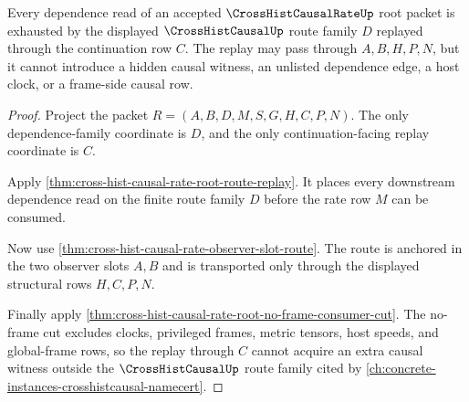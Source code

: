 \begin{theorem}
\label{thm:cross-hist-causal-rate-root-dependence-route-exhaustion}
Every dependence read of an accepted $\CrossHistCausalRateUp$ root packet is exhausted by the displayed $\CrossHistCausalUp$ route family $D$ replayed through the continuation row $C$. The replay may pass through $A,B,H,P,N$, but it cannot introduce a hidden causal witness, an unlisted dependence edge, a host clock, or a frame-side causal row.
\end{theorem}
\begin{proof}
Project the packet $R=(A,B,D,M,S,G,H,C,P,N)$. The only dependence-family coordinate is $D$, and the only continuation-facing replay coordinate is $C$.

Apply \autoref{thm:cross-hist-causal-rate-root-route-replay}. It places every downstream dependence read on the finite route family $D$ before the rate row $M$ can be consumed.

Now use \autoref{thm:cross-hist-causal-rate-observer-slot-route}. The route is anchored in the two observer slots $A,B$ and is transported only through the displayed structural rows $H,C,P,N$.

Finally apply \autoref{thm:cross-hist-causal-rate-root-no-frame-consumer-cut}. The no-frame cut excludes clocks, privileged frames, metric tensors, host speeds, and global-frame rows, so the replay through $C$ cannot acquire an extra causal witness outside the $\CrossHistCausalUp$ route family cited by \autoref{ch:concrete-instances-crosshistcausal-namecert}.
\end{proof}

